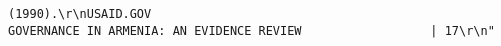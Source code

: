 \documentclass[
]{article}
\begin{document}
\begin{verbatim}
(1990).\r\nUSAID.GOV                                                           GOVERNANCE IN ARMENIA: AN EVIDENCE REVIEW                  | 17\r\n"                                                                                                                                                                                                                                                                                                                                                                                                                                                                                                                                                                                                                                                                                                                                                                                                                                                                                                                                                                                                                                                                                                                                                                                                                                                                                                                                                                                                                                                                                                                                                                                                                                                   

\end{verbatim}
\end{document}

